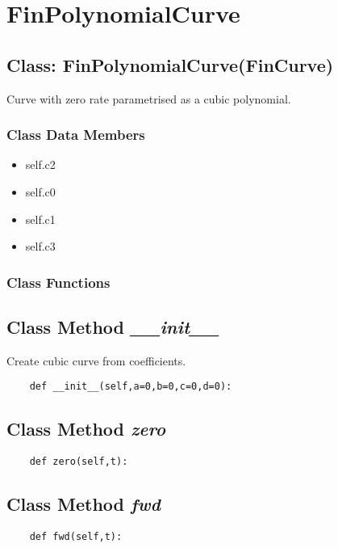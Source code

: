 \documentclass[twoside,11pt]{book}
\begin{document}
\newpage
\section{FinPolynomialCurve}

\subsection{Class: FinPolynomialCurve(FinCurve)}
Curve with zero rate parametrised as a cubic polynomial. 

\subsubsection{Class Data Members}
\begin{itemize}
\item{self.c2}
\item{self.c0}
\item{self.c1}
\item{self.c3}
\end{itemize}

\subsubsection{Class Functions}

\subsection{Class Method {\it \_\_init\_\_}}
Create cubic curve from coefficients. 

\begin{lstlisting}
    def __init__(self,a=0,b=0,c=0,d=0):
\end{lstlisting}

\subsection{Class Method {\it zero}}


\begin{lstlisting}
    def zero(self,t):
\end{lstlisting}

\subsection{Class Method {\it fwd}}


\begin{lstlisting}
    def fwd(self,t):
\end{lstlisting}
\end{document}
